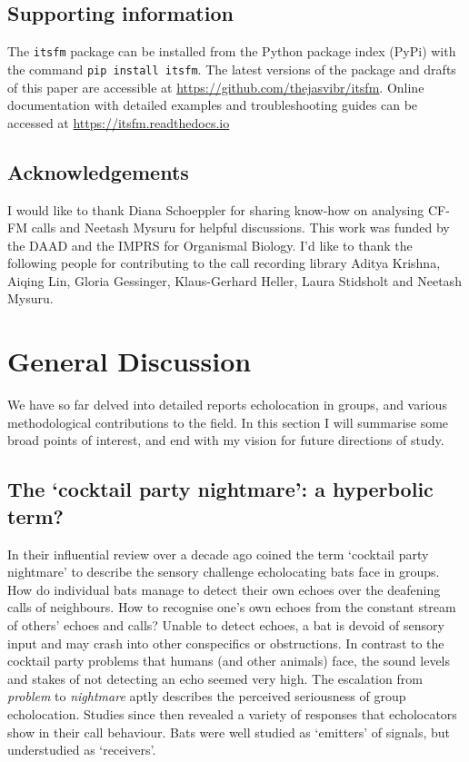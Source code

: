 \documentclass[
]{book}
\begin{document}
\hypertarget{supporting-information}{%
\section{Supporting information}\label{supporting-information}}

The \texttt{itsfm} package can be installed from the Python package index (PyPi) with the command \texttt{pip\ install\ itsfm}. The latest versions of the package and drafts of this paper are accessible at \url{https://github.com/thejasvibr/itsfm}. Online documentation with detailed examples and troubleshooting guides can be accessed at \url{https://itsfm.readthedocs.io}

\hypertarget{acknowledgements-5}{%
\section{Acknowledgements}\label{acknowledgements-5}}

I would like to thank Diana Schoeppler for sharing know-how on analysing CF-FM calls and Neetash Mysuru for helpful discussions. This work was funded by the DAAD and the IMPRS for Organismal Biology. I'd like to thank the following people for contributing to the call recording library Aditya Krishna, Aiqing Lin, Gloria Gessinger, Klaus-Gerhard Heller, Laura Stidsholt and Neetash Mysuru.

\hypertarget{general-discussion}{%
\chapter{General Discussion}\label{general-discussion}}

We have so far delved into detailed reports echolocation in groups, and various methodological contributions to the field. In this section I will summarise some broad points of interest, and end with my vision for future directions of study.

\hypertarget{the-cocktail-party-nightmare-a-hyperbolic-term}{%
\section{The `cocktail party nightmare': a hyperbolic term?}\label{the-cocktail-party-nightmare-a-hyperbolic-term}}

In their influential review over a decade ago \citet{ulanovsky2008a} coined the term `cocktail party nightmare' to describe the sensory challenge echolocating bats face in groups. How do individual bats manage to detect their own echoes over the deafening calls of neighbours. How to recognise one's own echoes from the constant stream of others' echoes and calls? Unable to detect echoes, a bat is devoid of sensory input and may crash into other conspecifics or obstructions. In contrast to the cocktail party problems that humans (and other animals) face, the sound levels and stakes of not detecting an echo seemed very high. The escalation from \emph{problem} to \emph{nightmare} aptly describes the perceived seriousness of group echolocation. Studies since then revealed a variety of responses that echolocators show in their call behaviour. Bats were well studied as `emitters' of signals, but understudied as `receivers'.
\end{document}
